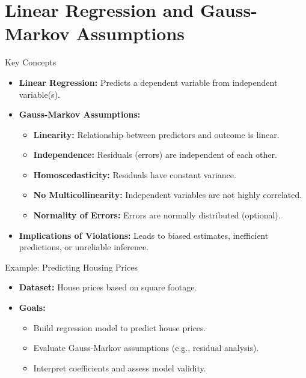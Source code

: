 \documentclass{beamer}
\begin{document}
\section{Linear Regression and Gauss-Markov Assumptions}
\begin{frame}{Key Concepts}
\begin{itemize}
    \item \textbf{Linear Regression:} Predicts a dependent variable from independent variable(s).
    \item \textbf{Gauss-Markov Assumptions:}
    \begin{itemize}
        \item \textbf{Linearity:} Relationship between predictors and outcome is linear.
        \item \textbf{Independence:} Residuals (errors) are independent of each other.
        \item \textbf{Homoscedasticity:} Residuals have constant variance.
        \item \textbf{No Multicollinearity:} Independent variables are not highly correlated.
        \item \textbf{Normality of Errors:} Errors are normally distributed (optional).
    \end{itemize}
    \item \textbf{Implications of Violations:} Leads to biased estimates, inefficient predictions, or unreliable inference.
\end{itemize}
\end{frame}

\begin{frame}{Example: Predicting Housing Prices}
\begin{itemize}
    \item \textbf{Dataset:} House prices based on square footage.
    \item \textbf{Goals:}
    \begin{itemize}
        \item Build regression model to predict house prices.
        \item Evaluate Gauss-Markov assumptions (e.g., residual analysis).
        \item Interpret coefficients and assess model validity.
    \end{itemize}
\end{itemize}
\end{frame}
\end{document}

